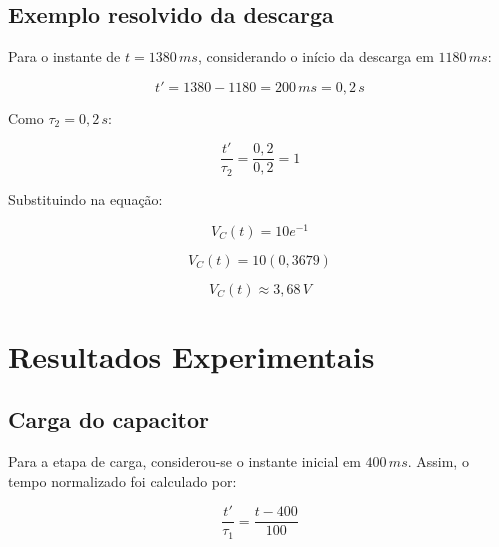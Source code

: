 \documentclass[12pt,a4paper]{article}
\begin{document}
\newpage
\subsection{Exemplo resolvido da descarga}

Para o instante de $t = 1380\,ms$, considerando o início da descarga em $1180\,ms$:

\begin{calcbox}
\[
t' = 1380 - 1180 = 200\,ms = 0{,}2\,s
\]

Como $\tau_2 = 0{,}2\,s$:

\[
\frac{t'}{\tau_2} = \frac{0{,}2}{0{,}2}=1
\]

Substituindo na equação:

\[
V_C(t)=10e^{-1}
\]

\[
V_C(t)=10(0{,}3679)
\]

\[
V_C(t)\approx 3{,}68\,V
\]
\end{calcbox}

\newpage
\section{Resultados Experimentais}

\subsection{Carga do capacitor}

Para a etapa de carga, considerou-se o instante inicial em $400\,ms$. Assim, o tempo normalizado foi calculado por:

\begin{calcbox}
\[
\frac{t'}{\tau_1}=\frac{t-400}{100}
\]
\end{calcbox}
\end{document}
